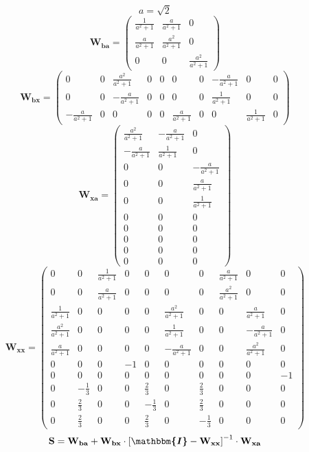 \documentclass[10pt]{article} \usepackage{amsmath} \usepackage{bbold}
\begin{document}
\[ a=\sqrt{2} \]
\[ \mathbf{W_{ba}} = \left(\begin{smallmatrix}  \frac{ 1 }{a^2 + 1}  &
\frac{ a }{ a^2 + 1 }  & 0 \\  \frac{ a }{ a^2 + 1 }  &  \frac{ a^2 }{
a^2 + 1 }  & 0 \\ 0 & 0 &  \frac{ a^2 }{ a^2 + 1 }
\end{smallmatrix}\right) \]
\[ \mathbf{W_{bx}} = \left(\begin{smallmatrix} 0 & 0 &  \frac{ a^2 }{
a^2 + 1 }  & 0 & 0 & 0 & 0 &  -\frac{ a }{ a^2 + 1 }  & 0 & 0 \\ 0 & 0
&  -\frac{ a }{ a^2 + 1 }  & 0 & 0 & 0 & 0 &  \frac{ 1 }{a^2 + 1}  & 0
& 0 \\  -\frac{ a }{ a^2 + 1 }  & 0 & 0 & 0 & 0 &  \frac{ a }{ a^2 + 1
}  & 0 & 0 &  \frac{ 1 }{a^2 + 1}  & 0 \end{smallmatrix}\right) \]
\[ \mathbf{W_{xa}} = \left(\begin{smallmatrix}  \frac{ a^2 }{ a^2 + 1
}  &  -\frac{ a }{ a^2 + 1 }  & 0 \\  -\frac{ a }{ a^2 + 1 }  &
\frac{ 1 }{a^2 + 1}  & 0 \\ 0 & 0 &  -\frac{ a }{ a^2 + 1 }  \\ 0 & 0
&  \frac{ a }{ a^2 + 1 }  \\ 0 & 0 &  \frac{ 1 }{a^2 + 1}  \\ 0 & 0 &
0 \\ 0 & 0 & 0 \\ 0 & 0 & 0 \\ 0 & 0 & 0 \\ 0 & 0 & 0
\end{smallmatrix}\right) \]
\[ \mathbf{W_{xx}} = \left(\begin{smallmatrix} 0 & 0 &  \frac{ 1 }{a^2
+ 1}  & 0 & 0 & 0 & 0 &  \frac{ a }{ a^2 + 1 }  & 0 & 0 \\ 0 & 0 &
\frac{ a }{ a^2 + 1 }  & 0 & 0 & 0 & 0 &  \frac{ a^2 }{ a^2 + 1 }  & 0
& 0 \\  \frac{ 1 }{a^2 + 1}  & 0 & 0 & 0 & 0 &  \frac{ a^2 }{ a^2 + 1
}  & 0 & 0 &  \frac{ a }{ a^2 + 1 }  & 0 \\  \frac{ a^2 }{ a^2 + 1 }
& 0 & 0 & 0 & 0 &  \frac{ 1 }{a^2 + 1}  & 0 & 0 &  -\frac{ a }{ a^2 +
1 }  & 0 \\  \frac{ a }{ a^2 + 1 }  & 0 & 0 & 0 & 0 &  -\frac{ a }{
a^2 + 1 }  & 0 & 0 &  \frac{ a^2 }{ a^2 + 1 }  & 0 \\ 0 & 0 & 0 & -1 &
0 & 0 & 0 & 0 & 0 & 0 \\ 0 & 0 & 0 & 0 & 0 & 0 & 0 & 0 & 0 & -1 \\ 0 &
-\frac{1}{3} & 0 & 0 & \frac{2}{3} & 0 & \frac{2}{3} & 0 & 0 & 0 \\ 0
& \frac{2}{3} & 0 & 0 & -\frac{1}{3} & 0 & \frac{2}{3} & 0 & 0 & 0 \\
0 & \frac{2}{3} & 0 & 0 & \frac{2}{3} & 0 & -\frac{1}{3} & 0 & 0 & 0
\end{smallmatrix}\right) \]
\[ \mathbf{S}=\mathbf{W_{ba}}+\mathbf{W_{bx}}\cdot\left[
\boldsymbol{\mathbbm{I}}
-\mathbf{W_{xx}}\right]^{-1}\cdot\mathbf{W_{xa}} \]
\end{document}
